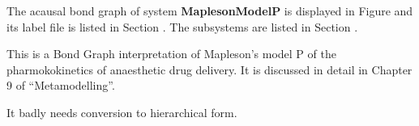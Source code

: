 

   The acausal bond graph of system \textbf{MaplesonModelP} is
   displayed in Figure  and its label
   file is listed in Section .
   The subsystems are listed in Section .

This is a Bond Graph interpretation of Mapleson's model P of the
pharmokokinetics of anaesthetic drug delivery. It is discussed in
detail in Chapter 9 of ``Metamodelling''.

It badly needs conversion to hierarchical form.


